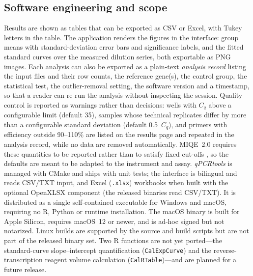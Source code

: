 \subsection{Software engineering and scope}

Results are shown as tables that can be exported as CSV or Excel, with Tukey
letters in the table. The application renders the figures in the interface:
group means with standard-deviation error bars and significance labels, and
the fitted standard curves over the measured dilution series, both exportable
as PNG images. Each analysis can also be exported as a plain-text
\emph{analysis record} listing the input files and their row counts, the
reference gene(s), the control group, the statistical test, the
outlier-removal setting, the software version and a timestamp, so that a
reader can re-run the analysis without inspecting the session. Quality
control is reported as warnings rather than decisions: wells with $C_q$ above
a configurable limit (default 35), samples whose technical replicates differ
by more than a configurable standard deviation (default 0.5~$C_q$), and
primers with efficiency outside 90--110\% are listed on the results page and
repeated in the analysis record, while no data are removed automatically.
MIQE~2.0 requires these quantities to be reported rather than to satisfy fixed
cut-offs \cite{bustin2025miqe2}, so the defaults are meant to be adapted to
the instrument and assay. \textit{qPCRtools} is managed with CMake and ships
with unit tests; the interface is bilingual and reads CSV/TXT input, and Excel
(\texttt{.xlsx}) workbooks when built with the optional OpenXLSX component
(the released binaries read CSV/TXT). It is distributed as a single
self-contained executable for Windows and macOS, requiring no R, Python or
runtime installation. The macOS binary is built for Apple Silicon, requires
macOS~12 or newer, and is ad-hoc signed but not notarized. Linux builds are
supported by the source and build scripts but are not part of the released
binary set. Two R
functions are not yet ported---the standard-curve
slope--intercept quantification (\texttt{CalExpCurve}) and the
reverse-transcription reagent volume calculation (\texttt{CalRTable})---and
are planned for a future release.
